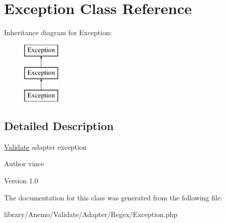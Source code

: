 \hypertarget{class_anemo_1_1_validate_1_1_adapter_1_1_regex_1_1_exception}{
\section{Exception Class Reference}
\label{class_anemo_1_1_validate_1_1_adapter_1_1_regex_1_1_exception}
}
Inheritance diagram for Exception:\begin{figure}[H]
\begin{center}
\leavevmode
\includegraphics[height=3.000000cm]{class_anemo_1_1_validate_1_1_adapter_1_1_regex_1_1_exception}
\end{center}
\end{figure}


\subsection{Detailed Description}
\hyperlink{class_anemo_1_1_validate}{Validate} adapter exception \begin{DoxyAuthor}{Author}
vince 
\end{DoxyAuthor}
\begin{DoxyVersion}{Version}
1.0 
\end{DoxyVersion}


The documentation for this class was generated from the following file:\begin{DoxyCompactItemize}
\item 
library/Anemo/Validate/Adapter/Regex/Exception.php\end{DoxyCompactItemize}
